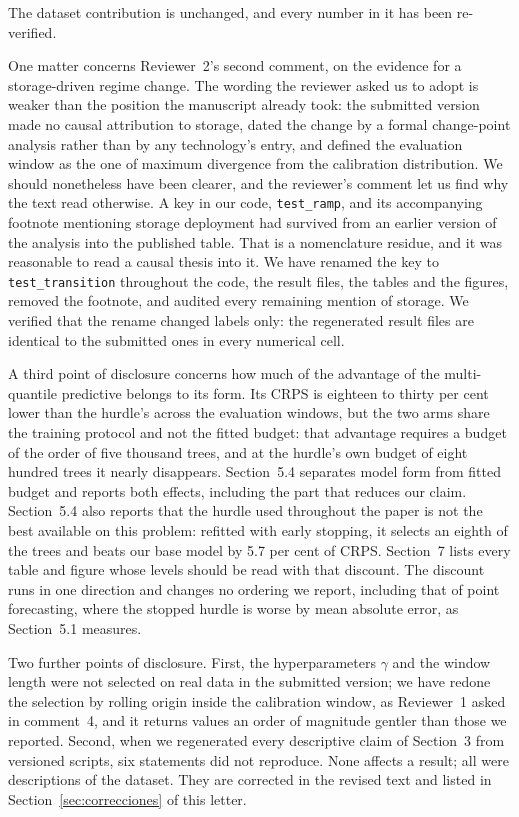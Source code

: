 \documentclass[11pt,a4paper]{article}
\begin{document}
The dataset contribution is unchanged, and every number in it has been re-verified.

One matter concerns Reviewer~2's second comment, on the evidence for a storage-driven regime change. The wording the reviewer asked us to adopt is weaker than the position the manuscript already took: the submitted version made no causal attribution to storage, dated the change by a formal change-point analysis rather than by any technology's entry, and defined the evaluation window as the one of maximum divergence from the calibration distribution. We should nonetheless have been clearer, and the reviewer's comment let us find why the text read otherwise. A key in our code, \texttt{test\_ramp}, and its accompanying footnote mentioning storage deployment had survived from an earlier version of the analysis into the published table. That is a nomenclature residue, and it was reasonable to read a causal thesis into it. We have renamed the key to \texttt{test\_transition} throughout the code, the result files, the tables and the figures, removed the footnote, and audited every remaining mention of storage. We verified that the rename changed labels only: the regenerated result files are identical to the submitted ones in every numerical cell.

A third point of disclosure concerns how much of the advantage of the multi-quantile predictive belongs to its form. Its CRPS is eighteen to thirty per cent lower than the hurdle's across the evaluation windows, but the two arms share the training protocol and not the fitted budget: that advantage requires a budget of the order of five thousand trees, and at the hurdle's own budget of eight hundred trees it nearly disappears. Section~5.4 separates model form from fitted budget and reports both effects, including the part that reduces our claim. Section~5.4 also reports that the hurdle used throughout the paper is not the best available on this problem: refitted with early stopping, it selects an eighth of the trees and beats our base model by 5.7 per cent of CRPS. Section~7 lists every table and figure whose levels should be read with that discount. The discount runs in one direction and changes no ordering we report, including that of point forecasting, where the stopped hurdle is worse by mean absolute error, as Section~5.1 measures.

Two further points of disclosure. First, the hyperparameters $\gamma$ and the window length were not selected on real data in the submitted version; we have redone the selection by rolling origin inside the calibration window, as Reviewer~1 asked in comment~4, and it returns values an order of magnitude gentler than those we reported. Second, when we regenerated every descriptive claim of Section~3 from versioned scripts, six statements did not reproduce. None affects a result; all were descriptions of the dataset. They are corrected in the revised text and listed in Section~\ref{sec:correcciones} of this letter.
\end{document}
